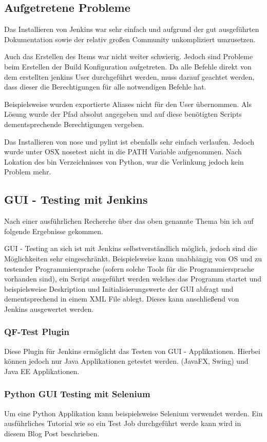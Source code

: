 \subsection{Aufgetretene Probleme}
Das Installieren von Jenkins war sehr einfach und aufgrund der gut ausgeführten Dokumentation sowie der relativ großen Community unkompliziert umzusetzen.

Auch das Erstellen des Items war nicht weiter schwierig. Jedoch sind Probleme beim Erstellen der Build Konfiguration aufgetreten. Da alle Befehle direkt von dem erstellten jenkins User durchgeführt werden, muss darauf geachtet werden, dass dieser die Berechtigungen für alle notwendigen Befehle hat. 

Beispielsweise wurden exportierte Aliases nicht für den User übernommen.
Als Lösung wurde der Pfad absolut angegeben und auf diese benötigten Scripts dementsprechende Berechtigungen vergeben.

Das Installieren von nose und pylint ist ebenfalls sehr einfach verlaufen. Jedoch wurde unter OSX nosetest nicht in die PATH Variable aufgenommen. Nach Lokation des bin Verzeichnisses von Python, war die Verlinkung jedoch kein Problem mehr.
\clearpage 
\subsection{GUI - Testing mit Jenkins}
Nach einer ausführlichen Recherche über das oben genannte Thema bin ich auf folgende Ergebnisse gekommen.

GUI - Testing an sich ist mit Jenkins selbstverständlich möglich, jedoch sind die Möglichkeiten sehr eingeschränkt. Beispielsweise kann unabhängig von OS und zu testender Programmiersprache (sofern solche Tools für die Programmiersprache vorhanden sind), ein Script ausgeführt werden welches das Programm startet und beispielsweise Deskription und Initialisierungswerte der GUI abfragt und dementsprechend in einem XML File ablegt. Dieses kann anschließend von Jenkins ausgewertet werden. 

\subsubsection{QF-Test Plugin \cite{qfs}}
Diese Plugin für Jenkins ermöglicht das Testen von GUI - Applikationen.
Hierbei können jedoch nur Java Applikationen getestet werden. (JavaFX, Swing) und Java EE Applikationen.

\subsubsection{Python GUI Testing mit Selenium \cite{py}}
Um eine Python Applikation kann beispielsweise Selenium verwendet werden. Ein ausführliches Tutorial wie so ein Test Job durchgeführt werde kann wird in diesem Blog Post beschrieben. \cite{py}

